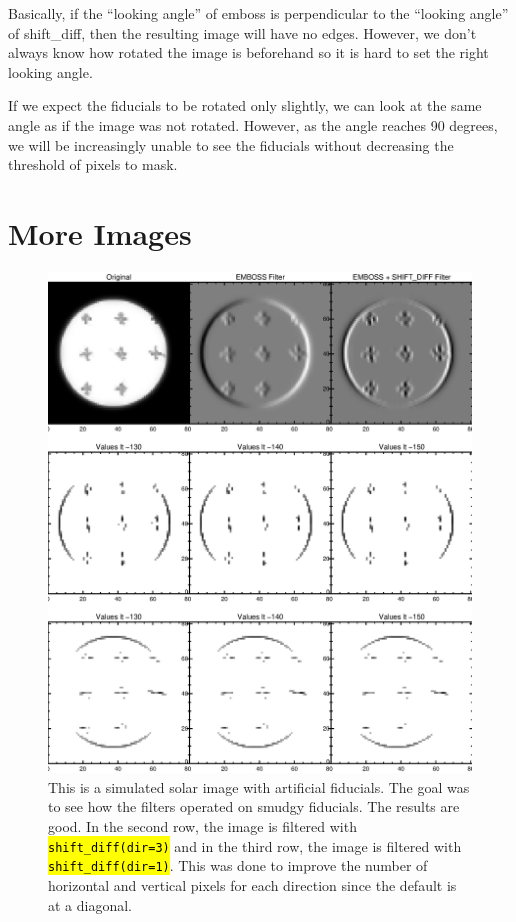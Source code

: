 \documentclass[10pt]{article}
\begin{document}
    Basically, if the ``looking angle'' of emboss is perpendicular to the ``looking angle'' of shift\_diff, then the resulting image will have no edges. However, we don't always know how rotated the image is beforehand so it is hard to set the right looking angle. 


    If we expect the fiducials to be rotated only slightly, we can look at the same angle as if the image was not rotated. However, as the angle reaches 90 degrees, we will be increasingly unable to see the fiducials without decreasing the threshold of pixels to mask.

\newpage 

\section{More Images}    

\begin{figure}[!h]
    \centering
    \includegraphics[width=.9\textwidth]{plots_tables_images/fidcomp.eps}    
    \caption{This is a simulated solar image with artificial fiducials. The goal was to see how the filters operated on smudgy fiducials. The results are good. In the second row, the image is filtered with \hl{\texttt{shift\_diff(dir=3)}} and in the third row, the image is filtered with \hl{\texttt{shift\_diff(dir=1)}}. This was done to improve the number of horizontal and vertical pixels for each direction since the default is at a diagonal.}
\end{figure}
\end{document}
